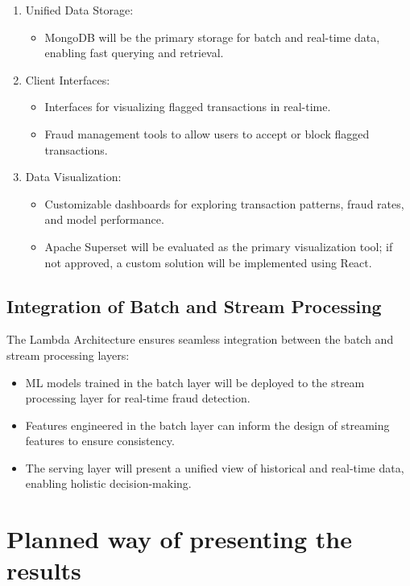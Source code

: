 \documentclass[12pt,a4paper, hidelinks]{article}
\begin{document}
\begin{enumerate}
    \item Unified Data Storage:
        \begin{itemize}
            \item MongoDB will be the primary storage for batch and real-time data, enabling fast querying and retrieval.
        \end{itemize}
    \item Client Interfaces:
        \begin{itemize}
            \item Interfaces for visualizing flagged transactions in real-time.
            \item Fraud management tools to allow users to accept or block flagged transactions.
        \end{itemize}
    \item Data Visualization:
        \begin{itemize}
            \item Customizable dashboards for exploring transaction patterns, fraud rates, and model performance.
            \item Apache Superset will be evaluated as the primary visualization tool; if not approved, a custom solution will be implemented using React.
        \end{itemize}
\end{enumerate}

\subsection{Integration of Batch and Stream Processing}
The Lambda Architecture ensures seamless integration between the batch and stream processing layers:
\begin{itemize}
    \item ML models trained in the batch layer will be deployed to the stream processing layer for real-time fraud detection.
    \item Features engineered in the batch layer can inform the design of streaming features to ensure consistency.
    \item The serving layer will present a unified view of historical and real-time data, enabling holistic decision-making.
\end{itemize}

\section{Planned way of presenting the results}
\end{document}
